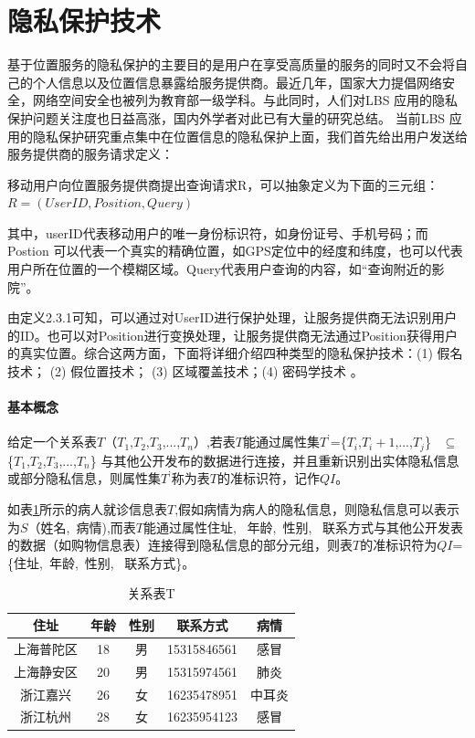 \section{隐私保护技术}
基于位置服务的隐私保护的主要目的是用户在享受高质量的服务的同时又不会将自己的个人信息以及位置信息暴露给服务提供商。最近几年，国家大力提倡网络安全，网络空间安全也被列为教育部一级学科。与此同时，人们对LBS 应用的隐私保护问题关注度也日益高涨，国内外学者对此已有大量的研究总结\cite{group}\cite{Beresford}\cite{ChengR}。 当前LBS 应用的隐私保护研究重点集中在位置信息的隐私保护上面，我们首先给出用户发送给服务提供商的服务请求定义：
\begin{define}[：LBS服务请求]
移动用户向位置服务提供商提出查询请求R，可以抽象定义为下面的三元组：
$R=(UserID,Position,Query)$
\end{define}
其中，userID代表移动用户的唯一身份标识符，如身份证号、手机号码；而Postion 可以代表一个真实的精确位置，如GPS定位中的经度和纬度，也可以代表用户所在位置的一个模糊区域。Query代表用户查询的内容，如“查询附近的影院”。

由定义2.3.1可知，可以通过对UserID进行保护处理，让服务提供商无法识别用户的ID。也可以对Position进行变换处理，让服务提供商无法通过Position获得用户的真实位置。综合这两方面，下面将详细介绍四种类型的隐私保护技术：(1) 假名技术； (2) 假位置技术； (3) 区域覆盖技术；(4) 密码学技术 。
\paragraph{基本概念}
\begin{define}[准标识符]
给定一个关系表$T$（$T_1$,$T_2$,$T_3$,...,$T_n$）,若表$T$能通过属性集$T^’$=\{$T_i$,$T_i+1$,...,$T_j$\} ~$\subseteq$~ \{$T_1$,$T_2$,$T_3$,...,$T_n$\} 与其他公开发布的数据进行连接，并且重新识别出实体隐私信息或部分隐私信息，则属性集$T^’$称为表$T$的准标识符，记作$QI$。
\end{define}

如表\ref{k-anony}所示的病人就诊信息表$T$,假如病情为病人的隐私信息，则隐私信息可以表示为$S$（姓名,~病情),而表$T$能通过属性{住址,~ 年龄,~性别,~ 联系方式}与其他公开发表的数据（如购物信息表）连接得到隐私信息的部分元组，则表$T$的准标识符为$QI$=\{住址,~年龄,~性别,~ 联系方式\}。
\begin{table}[hbp]
\centering  %
\begin{tabular}{ccccc}  %
\hline
住址 &年龄&性别 &联系方式&病情\\ \hline  %
上海普陀区&18 &男 &15315846561 &感冒\\         %
上海静安区 &20 &男 &15315974561 &肺炎\\        %
浙江嘉兴 &26 &女 &16235478951 &中耳炎\\
浙江杭州 &28 &女 &16235954123 &感冒\\ \hline
\end{tabular}
\caption{关系表T}\label{k-anony}
\end{table}


